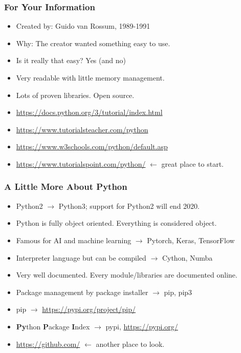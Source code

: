 
\begin{frame}
\frametitle{For Your Information}

\begin{itemize}
\item Created by: Guido van Rossum, 1989-1991
\item Why: The creator wanted something easy to use.
\item Is it really that easy? Yes (and no)
\item Very readable with little memory management.
\item Lots of proven libraries. Open source.
\item \url{https://docs.python.org/3/tutorial/index.html}
\item \url{https://www.tutorialsteacher.com/python}
\item \url{https://www.w3schools.com/python/default.asp}
\item \url{https://www.tutorialspoint.com/python/} $\longleftarrow$ great place to start.
\end{itemize}

\end{frame}

\begin{frame}
\frametitle{A Little More About Python}

\begin{itemize}
\item Python2 $\longrightarrow$ Python3; support for Python2 will end 2020.
\item Python is fully object oriented. Everything is considered object.
\item Famous for AI and machine learning $\longrightarrow$ Pytorch, Keras, TensorFlow
\item Interpreter language but can be compiled $\longrightarrow$ Cython, Numba
\item Very well documented. Every module/libraries are documented online.
\item Package management by package installer $\longrightarrow$ pip, pip3
\item pip $\longrightarrow$ \url{https://pypi.org/project/pip/}
\item \textbf{Py}thon \textbf{P}ackage \textbf{I}ndex $\longrightarrow$ pypi, \url{https://pypi.org/}
\item \url{https://github.com/} $\longleftarrow$ another place to look.
\end{itemize}

\end{frame}

